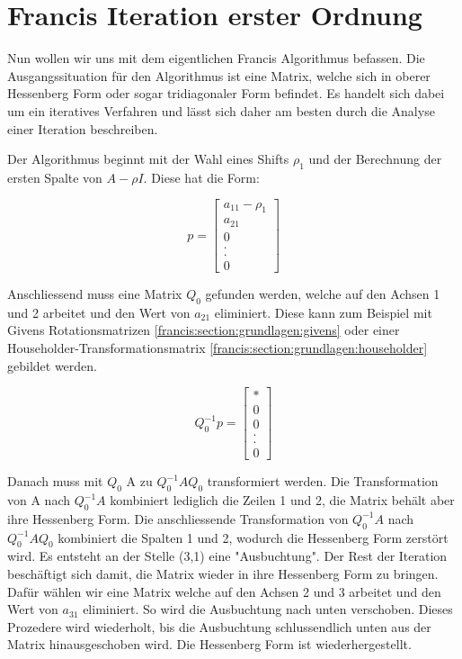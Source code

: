 \section{Francis Iteration erster Ordnung\label{francis:section:francis_iteration}}

Nun wollen wir uns mit dem eigentlichen Francis Algorithmus \cite{francis:watkins_book} befassen.
Die Ausgangssituation für den Algorithmus ist eine Matrix, welche sich in oberer Hessenberg Form oder sogar tridiagonaler Form befindet.
Es handelt sich dabei um ein iteratives Verfahren und lässt sich daher am besten durch die Analyse einer Iteration beschreiben.

Der Algorithmus beginnt mit der Wahl eines Shifts $\rho_{1}$ und der Berechnung der ersten Spalte von $A-\rho I$. 
Diese hat die Form:

\begin{equation}
	p=\begin{bmatrix}
	a_{11}-\rho_{1}\\
	a_{21}\\
	0\\
	.\\
	.\\
	0
	\end{bmatrix}
\end{equation}

Anschliessend muss eine Matrix $Q_{0}$ gefunden werden, welche auf den Achsen 1 und 2 arbeitet und den Wert von $a_{21}$ eliminiert. Diese kann zum Beispiel mit Givens Rotationsmatrizen \ref{francis:section:grundlagen:givens} oder einer Householder-Transformationsmatrix \ref{francis:section:grundlagen:householder} gebildet werden.

\begin{equation}
	Q_{0}^{-1}p=\begin{bmatrix}
	*\\
	0\\
	0\\
	.\\
	.\\
	0
	\end{bmatrix}
\end{equation}

Danach muss mit $Q_{0}$ A zu  $Q_{0}^{-1}AQ_{0}$ transformiert werden.
Die Transformation von A nach $Q_{0}^{-1}A$ kombiniert lediglich die Zeilen 1 und 2, die Matrix behält aber ihre Hessenberg Form.
Die anschliessende Transformation von $Q_{0}^{-1}A$ nach $Q_{0}^{-1}AQ_{0}$ kombiniert die Spalten 1 und 2, wodurch die Hessenberg Form zerstört wird.
Es entsteht an der Stelle (3,1) eine "Ausbuchtung".
Der Rest der Iteration beschäftigt sich damit, die Matrix wieder in ihre Hessenberg Form zu bringen.
Dafür wählen wir eine Matrix welche auf den Achsen 2 und 3 arbeitet und den Wert von $a_{31}$ eliminiert.
So wird die Ausbuchtung nach unten verschoben.
Dieses Prozedere wird wiederholt, bis die Ausbuchtung schlussendlich unten aus der Matrix hinausgeschoben wird.
Die Hessenberg Form ist wiederhergestellt.

